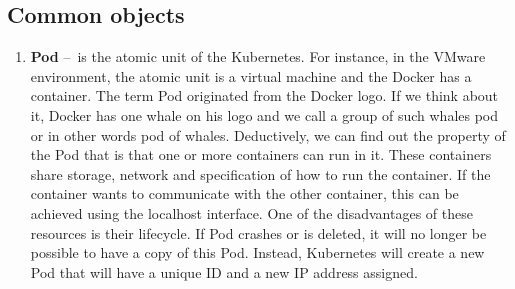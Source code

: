 \subsection{Common objects}
\label{objects}

\begin{enumerate}[itemsep=1mm, parsep=0pt]
    \item \textbf{Pod} \---\ is the atomic unit of the Kubernetes. For instance, in the VMware environment, the atomic unit is a virtual machine and the Docker has a container. The term Pod originated from the Docker logo. If we think about it, Docker has one whale on his logo and we call a group of such whales pod or in other words pod of whales. Deductively, we can find out the property of the Pod that is that one or more containers can run in it. These containers share storage, network and specification of how to run the container. If the container wants to communicate with the other container, this can be achieved using the localhost interface. One of the disadvantages of these resources is their lifecycle. If Pod crashes or is deleted, it will no longer be possible to have a copy of this Pod. Instead, Kubernetes will create a new Pod that will have a unique ID and a new IP address assigned.
    

\end{enumerate}
